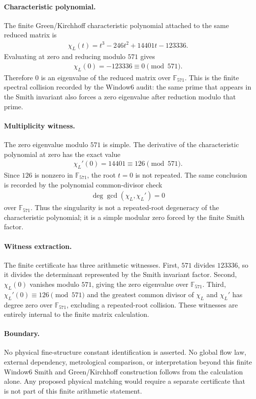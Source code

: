 \paragraph{Characteristic polynomial.}
The finite Green/Kirchhoff characteristic polynomial attached to the same reduced matrix is
$$
\begin{aligned}
\chi_L(t) = t^3 - 246t^2 + 14401t - 123336.
\end{aligned}
$$
Evaluating at zero and reducing modulo $571$ gives
$$
\begin{aligned}
\chi_L(0) = -123336 \equiv 0 \pmod{571}.
\end{aligned}
$$
Therefore $0$ is an eigenvalue of the reduced matrix over $\mathbb{F}_{571}$. This is the finite spectral collision recorded by the Window6 audit: the same prime that appears in the Smith invariant also forces a zero eigenvalue after reduction modulo that prime.

\paragraph{Multiplicity witness.}
The zero eigenvalue modulo $571$ is simple. The derivative of the characteristic polynomial at zero has the exact value
$$
\begin{aligned}
\chi_L'(0) = 14401 \equiv 126 \pmod{571}.
\end{aligned}
$$
Since $126$ is nonzero in $\mathbb{F}_{571}$, the root $t=0$ is not repeated. The same conclusion is recorded by the polynomial common-divisor check
$$
\begin{aligned}
\deg \gcd(\chi_L,\chi_L') = 0
\end{aligned}
$$
over $\mathbb{F}_{571}$. Thus the singularity is not a repeated-root degeneracy of the characteristic polynomial; it is a simple modular zero forced by the finite Smith factor.

\paragraph{Witness extraction.}
The finite certificate has three arithmetic witnesses. First, $571$ divides $123336$, so it divides the determinant represented by the Smith invariant factor. Second, $\chi_L(0)$ vanishes modulo $571$, giving the zero eigenvalue over $\mathbb{F}_{571}$. Third, $\chi_L'(0) \equiv 126 \pmod{571}$ and the greatest common divisor of $\chi_L$ and $\chi_L'$ has degree zero over $\mathbb{F}_{571}$, excluding a repeated-root collision. These witnesses are entirely internal to the finite matrix calculation.

\paragraph{Boundary.}
No physical fine-structure constant identification is asserted. No global flow law, external dependency, metrological comparison, or interpretation beyond this finite Window6 Smith and Green/Kirchhoff construction follows from the calculation alone. Any proposed physical matching would require a separate certificate that is not part of this finite arithmetic statement.
